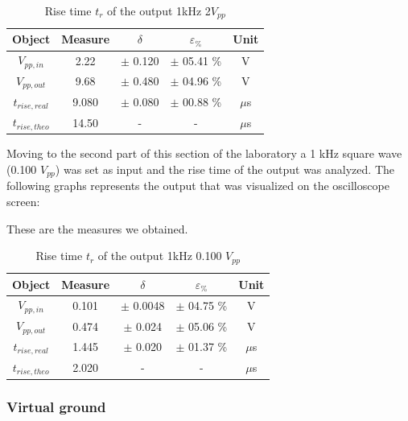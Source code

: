 \documentclass[../main.tex]{subfiles}
\begin{document}
\begin{table}[h!]
\centering	

\begin{tabular}{ccccc}
\textbf{Object} & \textbf{Measure}   & \textbf{$\delta$} & \textbf{$\varepsilon_{\%}$} & \textbf{Unit} \\
\hline
$V_{pp,in}$  & 2.22 & $\pm$ 0.120  & $\pm$ 05.41 \% &  V \\ 
\hline
$V_{pp,out}$ & 9.68 & $\pm$ 0.480  & $\pm$ 04.96 \% &  V \\ 
\hline
$t_{rise,real}$ & 9.080 & $\pm$ 0.080 & $\pm$ 00.88 \% & $\mu$s \\
\hline
$t_{rise,theo}$ & 14.50  &  -  & -  & $\mu$s \\ 

\end{tabular}
\caption*{Rise time $t_r$ of the output 1kHz 2$V_{pp}$}
\end{table}





Moving to the second part of this section of the laboratory a 1 kHz square wave (0.100 $V_{pp}$) was set as input and the rise time of the output was analyzed.
The following graphs represents the output that was visualized on the oscilloscope screen:


These are the measures we obtained.


\begin{table}[h!]
\centering	

\begin{tabular}{ccccc}
\textbf{Object} & \textbf{Measure}   & \textbf{$\delta$} & \textbf{$\varepsilon_{\%}$} & \textbf{Unit} \\
\hline
$V_{pp,in}$  & 0.101  & $\pm$ 0.0048 & $\pm$ 04.75 \% &  V \\ 
\hline
$V_{pp,out}$ & 0.474 & $\pm$ 0.024 & $\pm$ 05.06 \% &  V \\ 
\hline
$t_{rise,real}$ & 1.445 & $\pm$ 0.020 & $\pm$ 01.37 \% & $\mu$s \\
\hline
$t_{rise,theo}$ &  2.020 &  -  & -  & $\mu$s \\ 

\end{tabular}
\caption*{Rise time $t_r$ of the output 1kHz 0.100 $V_{pp}$}
\end{table}





\subsubsection*{Virtual ground}
\end{document}
